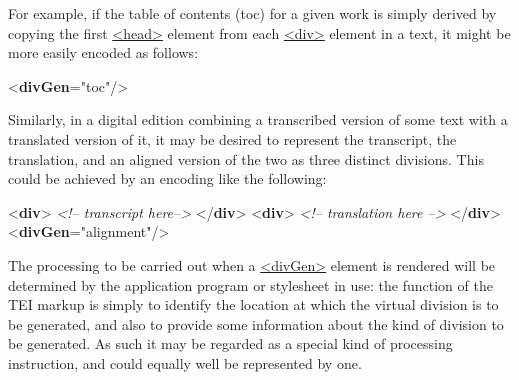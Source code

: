 For example, if the table of contents (toc) for a given work is simply derived by copying the first \hyperref[TEI.head]{<head>} element from each \hyperref[TEI.div]{<div>} element in a text, it might be more easily encoded as follows: \par\bgroup{}\exampleFont \begin{shaded}\noindent\mbox{}{<\textbf{divGen}\hspace*{1em}{type}="{toc}"/>}\end{shaded}\egroup\par \noindent  Similarly, in a digital edition combining a transcribed version of some text with a translated version of it, it may be desired to represent the transcript, the translation, and an aligned version of the two as three distinct divisions. This could be achieved by an encoding like the following: \par\bgroup{}\exampleFont \begin{shaded}\noindent\mbox{}{<\textbf{div}>}\mbox{}\newline 
\textit{<!-- transcript here-->}\mbox{}\newline 
{</\textbf{div}>}\mbox{}\newline 
{<\textbf{div}>}\mbox{}\newline 
\textit{<!-- translation here -->}\mbox{}\newline 
{</\textbf{div}>}\mbox{}\newline 
{<\textbf{divGen}\hspace*{1em}{type}="{alignment}"/>}\end{shaded}\egroup\par \noindent  The processing to be carried out when a \hyperref[TEI.divGen]{<divGen>} element is rendered will be determined by the application program or stylesheet in use: the function of the TEI markup is simply to identify the location at which the virtual division is to be generated, and also to provide some information about the kind of division to be generated. As such it may be regarded as a special kind of processing instruction, and could equally well be represented by one.

